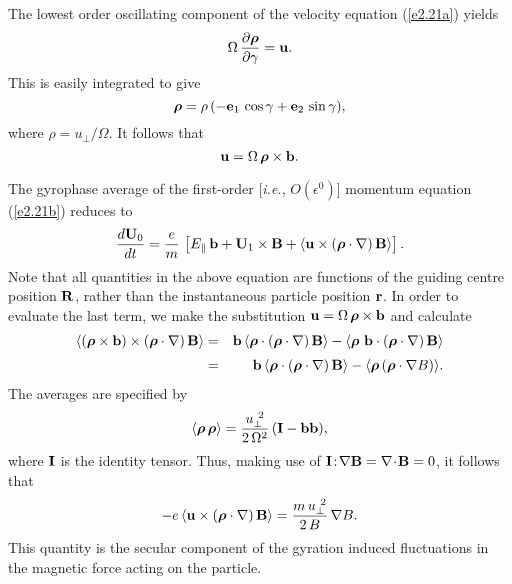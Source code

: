 The lowest order oscillating component of the velocity equation (\ref{e2.21a}) yields
\begin{equation}\label{e2.34}
{\Omega}\,\frac{\partial\mbox{\boldmath$\rho$}}{\partial \gamma} = {\bf u}.
\end{equation}
This is easily integrated to give
\begin{equation}
\mbox{\boldmath$\rho$} = \rho\,(-{\bf e}_1\,\cos\gamma+{\bf e}_2\,\sin\gamma),
\end{equation}
where $\rho = u_\perp/{\Omega}$. It follows that
\begin{equation}\label{e2.36}
{\bf u} = {\Omega}\, \mbox{\boldmath$\rho$}\times {\bf b}.
\end{equation}

The gyrophase average of the first-order [{\em i.e.}, $O(\epsilon^0)$]
momentum equation (\ref{e2.21b}) reduces to
\begin{equation}
\frac{d{\bf U}_0}{dt} = \frac{e}{m}\,\left[ E_\parallel\,{\bf b}
+ {\bf U}_1\times {\bf B} +\langle{\bf u}\times(\mbox{\boldmath$\rho$}\cdot\nabla)
\,{\bf B}\rangle\right].
\end{equation}
Note that all quantities in the above equation are functions of the
guiding centre position ${\bf R}$, rather than the instantaneous particle
position ${\bf r}$. 
In order to evaluate the last term, we make the substitution ${\bf u} = {\Omega}\, \mbox{\boldmath$\rho$}\times {\bf b}$ and calculate
\begin{eqnarray}
\langle (\mbox{\boldmath$\rho$}\times{\bf b})\times (\mbox{\boldmath$\rho$}\cdot\nabla)\,{\bf B} \rangle
&=& {\bf b}\,\langle \mbox{\boldmath$\rho$} \cdot (\mbox{\boldmath$\rho$}\cdot\nabla)\,{\bf B} \rangle
- \langle \mbox{\boldmath$\rho$}\,\,{\bf b}\cdot( \mbox{\boldmath$\rho$}\cdot\nabla)\,{\bf B}\rangle\nonumber
\\[0.5ex]
&=& {\bf b}\,\langle \mbox{\boldmath$\rho$} \cdot (\mbox{\boldmath$\rho$}\cdot\nabla)\,{\bf B} \rangle
- \langle \mbox{\boldmath$\rho$}\,( \mbox{\boldmath$\rho$}\cdot\nabla B)\rangle.
\end{eqnarray}
The averages are specified  by
\begin{equation}
\langle \mbox{\boldmath$\rho$}\,\mbox{\boldmath$\rho$}\rangle = \frac{u_\perp^{~2}}{2\,{\Omega}^2}
\,({\bf I} - {\bf b}{\bf b}),
\end{equation}
where ${\bf I}$ is the identity tensor. Thus, making use of
${\bf I}\!:\!\nabla{\bf B} = \nabla\!\cdot\!{\bf B} = 0$, it follows
that
\begin{equation}
-e \,\langle {\bf u} \times (\mbox{\boldmath$\rho$}\cdot\nabla )\,{\bf B}\rangle =
\frac{m\,u_\perp^{~2}}{2\,B} \,\nabla B.
\end{equation}
This quantity is the secular component of the gyration induced fluctuations in the magnetic
force acting on the particle. 

